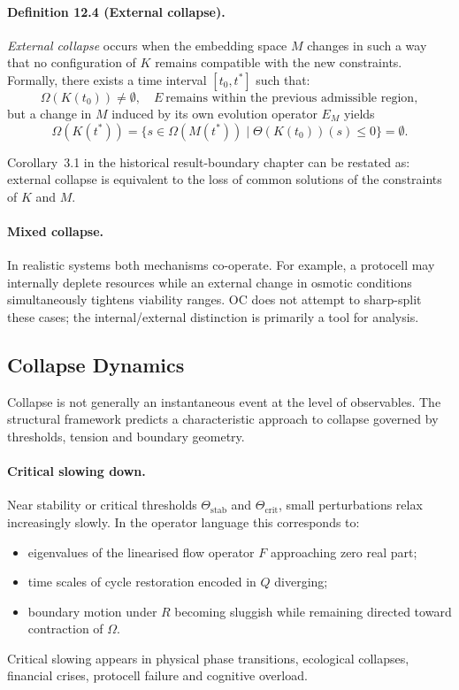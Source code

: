 \paragraph{Definition 12.4 (External collapse).}
\emph{External collapse} occurs when the embedding space \(M\) changes in such
a way that no configuration of \(K\) remains compatible with the new
constraints. Formally, there exists a time interval \([t_0,t^{\ast}]\) such
that:
\[
  \Omega(K(t_0))\neq\emptyset,
  \quad
  E\ \text{remains within the previous admissible region},
\]
but a change in \(M\) induced by its own evolution operator \(E_M\) yields
\[
  \Omega(K(t^{\ast})) =
    \big\{ s \in \Omega(M(t^{\ast})) \mid
           \Theta(K(t_0))(s)\le 0 \big\} = \emptyset.
\]

Corollary~3.1 in the historical result-boundary chapter can be restated as:
external collapse is equivalent to the loss of common solutions of the
constraints of \(K\) and \(M\).

\paragraph{Mixed collapse.}
In realistic systems both mechanisms co-operate. For example, a protocell
may internally deplete resources while an external change in osmotic
conditions simultaneously tightens viability ranges. OC does not attempt to
sharp-split these cases; the internal/external distinction is primarily a
tool for analysis.

\subsection{Collapse Dynamics}

Collapse is not generally an instantaneous event at the level of observables.
The structural framework predicts a characteristic approach to collapse
governed by thresholds, tension and boundary geometry.

\paragraph{Critical slowing down.}
Near stability or critical thresholds \(\Theta_{\mathrm{stab}}\) and
\(\Theta_{\mathrm{crit}}\), small perturbations relax increasingly slowly.
In the operator language this corresponds to:
\begin{itemize}
  \item eigenvalues of the linearised flow operator \(F\) approaching zero
        real part;
  \item time scales of cycle restoration encoded in \(Q\) diverging;
  \item boundary motion under \(R\) becoming sluggish while remaining directed
        toward contraction of \(\Omega\).
\end{itemize}
Critical slowing appears in physical phase transitions, ecological collapses,
financial crises, protocell failure and cognitive overload.

